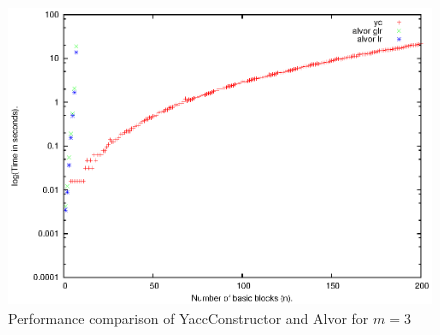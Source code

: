 \documentclass{sigplanconf}
\begin{document}
      \begin{figure}[h!]%
        \includegraphics[scale=0.65]{Graphics/m3.eps}
        \caption{Performance comparison of YaccConstructor and Alvor for $m = 3$}
       \label{perfm3}
      \end{figure}    
\end{document}
